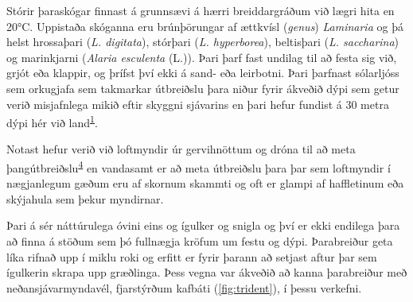 \documentclass[icelandic,]{book}
\begin{document}
Stórir þaraskógar finnast á grunnsævi á hærri breiddargráðum við lægri hita en 20°C. Uppistaða skóganna eru brúnþörungar af ættkvísl (\emph{genus}) \emph{Laminaria} og þá helst hrossaþari (\emph{L. digitata}), stórþari (\emph{L. hyperborea}), beltisþari (\emph{L. saccharina}) og marinkjarni (\emph{Alaria esculenta} (L.)). Þari þarf fast undilag til að festa sig við, grjót eða klappir, og þrífst því ekki á sand- eða leirbotni. Þari þarfnast sólarljóss sem orkugjafa sem takmarkar útbreiðslu þara niður fyrir ákveðið dýpi sem getur verið misjafnlega mikið eftir skyggni sjávarins en þari hefur fundist á 30 metra dýpi hér við land\textsuperscript{\protect\hyperlink{ref-karl1997}{1}}.

Notast hefur verið við loftmyndir úr gervihnöttum og dróna til að meta þangútbreiðslu\textsuperscript{\protect\hyperlink{ref-Gunnarsson2017}{4}} en vandasamt er að meta útbreiðslu þara þar sem loftmyndir í nægjanlegum gæðum eru af skornum skammti og oft er glampi af haffletinum eða skýjahula sem þekur myndirnar.

Þari á sér náttúrulega óvini eins og ígulker og snigla og því er ekki endilega þara að finna á stöðum sem þó fullnægja kröfum um festu og dýpi. Þarabreiður geta líka rifnað upp í miklu roki og erfitt er fyrir þarann að setjast aftur þar sem ígulkerin skrapa upp græðlinga. Þess vegna var ákveðið að kanna þarabreiður með neðansjávarmyndavél, fjarstýrðum kafbáti (\ref{fig:trident}), í þessu verkefni.
\end{document}
